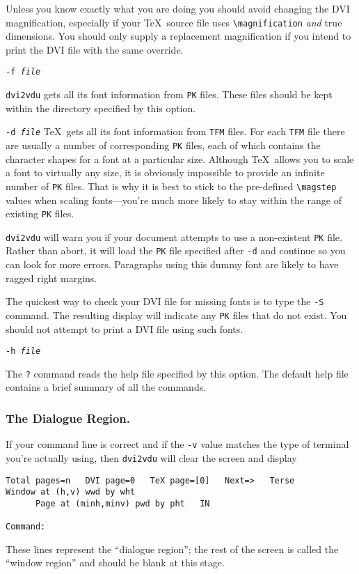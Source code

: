 \begin{list}
Unless you know exactly what you are doing you should avoid changing
the DVI magnification,
especially if your \TeX\ source file uses  \hbox{\verb|\magnification|}
 {\em and} true
dimensions.
You should only supply a replacement magnification if you intend to
print the DVI file with the same override.
             

\item[\tt -f \em file]

{\tt dvi2vdu} gets all its font information from \verb+PK+ files.
These files should be kept within the directory specified by this option.

\item[\tt -d \em file]
\TeX\ gets all its font information from \verb+TFM+ files.  For each \verb+TFM+ file there
are usually a number of corresponding \verb+PK+ files, each of which
contains the character shapes for a font at a particular size.
Although \TeX\ allows you to scale a font to virtually any size,
it is obviously impossible to provide an infinite number of \verb+PK+ files.
That is why it is best to
stick to the pre-defined \hbox{\verb|\magstep|}
values when scaling fonts---you're
much more likely to stay within the range of existing \verb+PK+ files.

{\tt dvi2vdu} will warn you if your document attempts to use a
non-existent \verb+PK+ file.
Rather than abort, it will load the \verb+PK+ file specified after {\tt-d} and continue
so you can look for more errors.
Paragraphs using this dummy font are likely to have ragged right margins.

The quickest way to check your DVI file for missing fonts is to type
the {\tt-S} command.  The resulting display will indicate any \verb+PK+ files that do
not exist.  You should not attempt to print a DVI file using such fonts.

\item[\tt-h \em file]

The {\tt ?} command reads the help file specified by this option.
The default help file contains a brief summary of all the commands.
\end{list}


\subsubsection{The Dialogue Region.}

If your command line is correct and if the {\tt -v} value matches the type of
terminal you're actually using, then {\tt dvi2vdu} will clear the screen
and display
\begin{verbatim}
Total pages=n   DVI page=0   TeX page=[0]   Next=>   Terse
Window at (h,v) wwd by wht
      Page at (minh,minv) pwd by pht   IN

Command:
\end{verbatim}
These lines represent the ``dialogue region''; the rest of the screen is
called the ``window region'' and should be blank at this stage.


